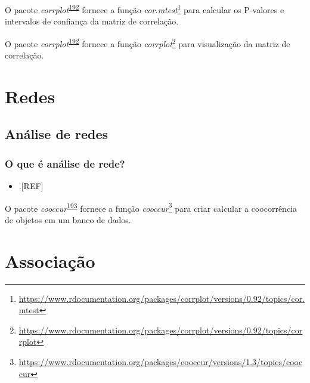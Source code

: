 \documentclass[
  a4paper,
]{book}
\providecommand{\tightlist}{%
  \setlength{\itemsep}{0pt}\setlength{\parskip}{0pt}}
\renewcommand{\href}[2]{#2\footnote{\url{#1}}}
\newenvironment{infobox}[1]
  {
  \begin{itemize}
  \renewcommand{\labelitemi}{
    \raisebox{-.7\height}[0pt][0pt]{
      {\setkeys{Gin}{width=3em,keepaspectratio}
        \texttt{[image: \#1]}}
    }
  }
  \setlength{\fboxsep}{1em}
  \begin{blackbox}
  \item
  }
  {
  \end{blackbox}
  \end{itemize}
  }
\begin{document}
\begin{infobox}{images/Rlogo}
O pacote \emph{corrplot}\textsuperscript{\protect\hyperlink{ref-corrplot-2}{192}} fornece a função \href{https://www.rdocumentation.org/packages/corrplot/versions/0.92/topics/cor.mtest}{\emph{cor.mtest}} para calcular os P-valores e intervalos de confiança da matriz de correlação.

\end{infobox}

\begin{infobox}{images/Rlogo}
O pacote \emph{corrplot}\textsuperscript{\protect\hyperlink{ref-corrplot-2}{192}} fornece a função \href{https://www.rdocumentation.org/packages/corrplot/versions/0.92/topics/corrplot}{\emph{corrplot}} para visualização da matriz de correlação.

\end{infobox}

\hypertarget{analise-redes}{%
\chapter{\texorpdfstring{\textbf{Redes}}{Redes}}\label{analise-redes}}

\hypertarget{redes}{%
\section{Análise de redes}\label{redes}}

\hypertarget{o-que-uxe9-anuxe1lise-de-rede}{%
\subsection{O que é análise de rede?}\label{o-que-uxe9-anuxe1lise-de-rede}}

\begin{itemize}
\tightlist
\item
  .{[}REF{]}
\end{itemize}

\begin{infobox}{images/Rlogo}
O pacote \emph{cooccur}\textsuperscript{\protect\hyperlink{ref-cooccur}{193}} fornece a função \href{https://www.rdocumentation.org/packages/cooccur/versions/1.3/topics/cooccur}{\emph{cooccur}} para criar calcular a coocorrência de objetos em um banco de dados.

\end{infobox}

\hypertarget{analise-inferencial-associacao}{%
\chapter{\texorpdfstring{\textbf{Associação}}{Associação}}\label{analise-inferencial-associacao}}
\end{document}
